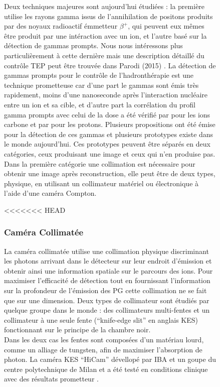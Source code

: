 \documentclass[11pt,a4paper,oldfontcommands]{memoir}
\begin{document}
\begin{figure}
Deux techniques majeures sont aujourd'hui étudiées : la première utilise les rayons gamma issus de l'annihilation de positons produits par des noyaux radioactif émmetteur $\beta^+$, qui peuvent eux mêmes être produit par une intéraction avec un ion, et l'autre basé sur la détection de gammas prompts. Nous nous intéressons plus particulièrement à cette dernière mais une description détaillé du contrôle TEP peut être trouvée dans Parodi (2015) \cite{Parodi20157153}. La détection de gammas prompts pour le contrôle de l'hadronthérapie est une technique prometteuse car d'une part le gammas sont émis très rapidement, moins d'une nanoseconde après l’interaction nucléaire entre un ion et sa cible, et d'autre part la corrélation du profil gamma prompts avec celui de la dose a été vérifié par \cite{PGMonitoringC12}pour les ions carbone et par \cite{Min2006} pour les protons. Plusieurs propositions ont été émise pour la détection de ces gammas et plusieurs prototypes existe dans le monde aujourd'hui. Ces prototypes peuvent être séparés en deux catégories, ceux produisant une image et ceux qui n'en produise pas. Dans la première catégorie une collimation est nécessaire pour obtenir une image après reconstruction, elle peut être de deux types, physique, en utilisant un collimateur matériel ou électronique à l'aide d'une caméra Compton. 

<<<<<<< HEAD
\subsubsection{Caméra Collimatée}
La caméra collimatée utilise une collimation physique discriminant les photons arrivant dans le détecteur sur leur endroit d'émission et obtenir ainsi une information spatiale sur le parcours des ions. Pour maximiser l’efficacité de détection tout en fournissant l'information sur la profondeur de l’émission des PG cette collimation ne se fait que sur une dimension. Deux types de collimateur sont étudiés par quelque groupe dans le monde : des collimateurs multi-fentes \cite{Pinto_2014,MinSimu} et un collimateur à une seule fente (\enquote{knife-edge slit} en anglais KES)\cite{Smeets_2012} fonctionnant sur le principe de la chambre noir.\\
Dans les deux cas les fentes sont composées d'un matériau lourd, comme un alliage de tungsten, afin de maximiser l'absorption de photon. 
La caméra KES \enquote{HiCam} dévellopé par IBA et un goupe du centre polytechnique de Milan et a été testé en conditions clinique avec des résultats prometteur \cite{Richter2016}.


\end{figure}
\end{document}
